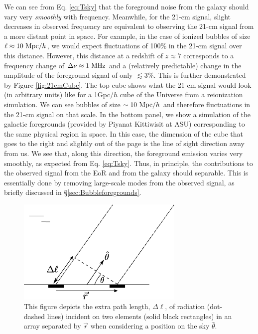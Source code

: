 We can see from Eq. \ref{eq:Tsky} that the foreground noise from the galaxy should vary very \textit{smoothly} with frequency. Meanwhile, for the 21-cm signal, slight decreases in observed frequency are equivalent to observing the 21-cm signal from a more distant point in space. For example, in the case of ionized bubbles of size $\ell \approx 10\ \text{Mpc/$h$}$, we would expect fluctuations of 100\% in the 21-cm signal over this distance. However, this distance at a redshift of $z \approx 7$ corresponds to a frequency change of $\Delta \nu \approx 1\ \text{MHz}$ and a  (relatively predictable) change in the amplitude of the foreground signal of only $\lesssim3\%$. This is further demonstrated by Figure \ref{fig:21cmCube}. The top cube shows what the 21-cm signal would look (in arbitrary units) like for a 1Gpc/$h$ cube of the Universe from a reionization simulation. We can see bubbles of size $\sim10\ \text{Mpc/$h$}$ and therefore fluctuations in the 21-cm signal on that scale. In the bottom panel, we show a simulation of the galactic foregrounds (provided by Piyanat Kittiwisit at ASU) corresponding to the same physical region in space. In this case, the dimension of the cube that goes to the right and slightly out of the page is the line of sight direction away from us. We see that, along this direction, the foreground emission varies very smoothly, as expected from Eq. \ref{eq:Tsky}. Thus, in principle, the contributions to the observed signal from the EoR and from the galaxy should separable. This is essentially done by removing large-scale modes from the observed signal, as briefly discussed in \S \ref{sec:Bubbleforegrounds}.



\begin{figure}[h]
  \centering
  \includegraphics[width=8cm]{interferometry.eps}
  \caption{This figure depicts the extra path length, $\Delta \ell$, of radiation (dot-dashed lines) incident on two elements (solid black rectangles) in an array separated by $\vec{r}$ when considering a position on the sky $\hat{\theta}$.}
  \label{fig:interferometry}
\end{figure}


